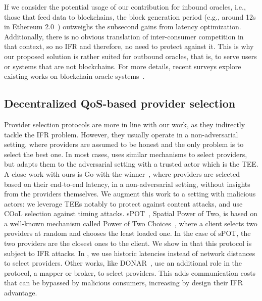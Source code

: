 If we consider the potential usage of our contribution for inbound oracles, i.e., those that feed data to blockchains, the block generation period (e.g., around 12s in Ethereum 2.0~\cite{etherscan.ioEthereumAverageBlock}) outweighs the subsecond gains from latency optimization.
Additionally, there is no obvious translation of inter-consumer competition in that context, so no IFR and therefore, no need to protect against it. 
This is why our proposed solution \sysname is rather suited for outbound oracles, that is, to serve users or systems that are not blockchains.
For more details, recent surveys explore existing works on blockchain oracle systems~\cite{caldarelliOverviewBlockchainOracle2022,al-breikiTrustworthyBlockchainOracles2020,heissOraclesTrustworthyData2019}. 

\subsection{Decentralized QoS-based provider selection}

Provider selection protocols are more in line with our work, as they indirectly tackle the IFR problem.
However, they usually operate in a non-adversarial setting, where providers are assumed to be honest and the only problem is to select the best one. 
In most cases, \sysname\space uses similar mechanisms to select providers, but adapts them to the adversarial setting with a trusted actor which is the TEE.
A close work with ours is Go-with-the-winner~\cite{liuGowiththewinnerPerformanceBased2016}, where providers are selected based on their end-to-end latency, in a non-adversarial setting, without insights from the providers themselves. 
We augment this work to a setting with malicious actors: we leverage TEEs notably to protect against content attacks, and use COoL selection against timing attacks.
sPOT~\cite{panigrahyAnalysisEvaluationProximitybased2022}, Spatial Power of Two, is based on a well-known mechanism called Power of Two Choices~\cite{mitzenmacherPowerTwoChoices2001}, where a client selects two providers at random and chooses the least loaded one.
In the case of sPOT, the two providers are the closest ones to the client. 
We show in  that this protocol is subject to IFR attacks.
In \sysname, we use historic latencies instead of network distances to select providers.
Other works, like DONAR~\cite{wendellDONARDecentralizedServer2010}, use an additional role in the protocol, a mapper or broker, to select providers. 
This adds communication costs that can be bypassed by malicious consumers, increasing by design their IFR advantage.

